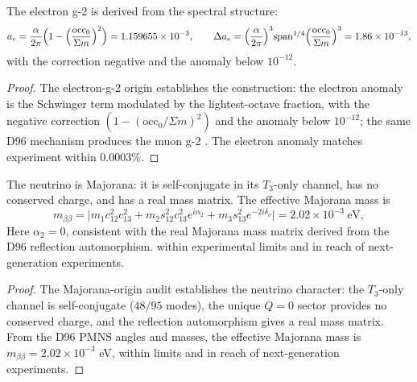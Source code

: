 \begin{theorem}
\label{c11:thm:electron-g2}
The electron g-2 is derived from the spectral structure:
\begin{equation}
\label{c11:eq:electron-g2}
a_e = \frac{\alpha}{2\pi}\Bigl(1 - \Bigl(\frac{\mathrm{occ}_0}{\Sigma m}\Bigr)^2\Bigr)
= 1.159655\times10^{-3},
\qquad
\Delta a_e = \Bigl(\frac{\alpha}{2\pi}\Bigr)^3 \mathrm{span}^{1/4}
\Bigl(\frac{\mathrm{occ}_0}{\Sigma m}\Bigr)^3 = 1.86\times10^{-13},
\end{equation}
with the correction negative and the anomaly below $10^{-12}$.
\end{theorem}

\begin{proof}
The electron-g-2 origin \cite{c11:QG178} establishes the construction: the electron anomaly is
the Schwinger term modulated by the lightest-octave fraction, with the negative correction
$(1 - (\mathrm{occ}_0/\Sigma m)^2)$ and the anomaly below $10^{-12}$; the same D96
mechanism produces the muon g-2 \cite{c11:QG171}. The electron anomaly matches experiment
within $0.0003\%$.
\end{proof}

\begin{theorem}
\label{c11:thm:majorana}
The neutrino is Majorana: it is self-conjugate in its $T_3$-only channel, has no conserved
charge, and has a real mass matrix. The effective Majorana mass is
\begin{equation}
\label{c11:eq:mbb}
m_{\beta\beta} = \bigl|m_1c_{12}^2c_{13}^2 + m_2s_{12}^2c_{13}^2e^{i\alpha_2}
+ m_3s_{13}^2e^{-2i\delta_\nu}\bigr| = 2.02\times10^{-3}\ \mathrm{eV},
\end{equation}
Here $\alpha_2 = 0$, consistent with the real Majorana mass matrix derived from the D96
reflection automorphism.
within experimental limits and in reach of next-generation experiments.
\end{theorem}

\begin{proof}
The Majorana-origin audit \cite{c11:QG179} establishes the neutrino character: the $T_3$-only
channel is self-conjugate ($48/95$ modes), the unique $Q=0$ sector provides no conserved
charge, and the reflection automorphism gives a real mass matrix. From the D96 PMNS angles
and masses, the effective Majorana mass is $m_{\beta\beta} = 2.02\times10^{-3}$ eV, within
limits and in reach of next-generation experiments.
\end{proof}

